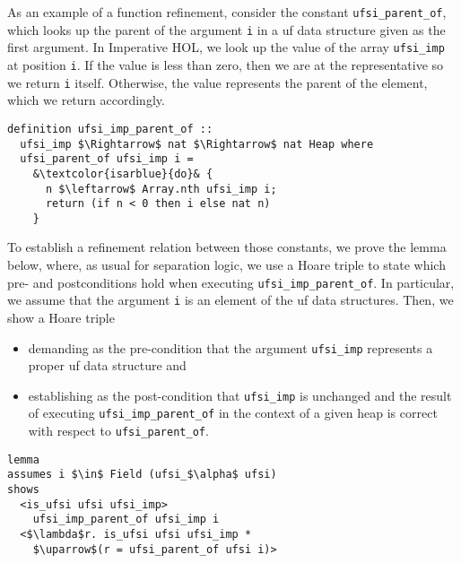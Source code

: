 \documentclass[
  sigplan,
  10pt,
  anonymous,
  review,
  ]{acmart}
\begin{document}
As an example of a function refinement, consider the constant \lstinline|ufsi_parent_of|, which looks up the parent of the argument \lstinline|i| in a \acrshort{uf} data structure given as the first argument.
In Imperative HOL, we look up the value of the array \lstinline|ufsi_imp| at position \lstinline|i|.
If the value is less than zero, then we are at the representative so we return \lstinline|i| itself.
Otherwise, the value represents the parent of the element, which we return accordingly.
\begin{lstlisting}
definition ufsi_imp_parent_of ::
  ufsi_imp $\Rightarrow$ nat $\Rightarrow$ nat Heap where
  ufsi_parent_of ufsi_imp i =
    &\textcolor{isarblue}{do}& {
      n $\leftarrow$ Array.nth ufsi_imp i;
      return (if n < 0 then i else nat n)
    }
\end{lstlisting}
To establish a refinement relation between those constants, we prove the lemma below, where, as usual for separation logic, we use a Hoare triple to state which pre- and postconditions hold when executing \lstinline|ufsi_imp_parent_of|.
In particular, we assume that the argument \lstinline|i| is an element of the \acrshort{uf} data structures.
Then, we show a Hoare triple
\begin{itemize}
  \item demanding as the pre-condition that the argument \lstinline|ufsi_imp| represents a proper \acrshort{uf} data structure and 
  \item establishing as the post-condition that \lstinline|ufsi_imp| is unchanged and the result of executing \lstinline|ufsi_imp_parent_of| in the context of a given heap is correct with respect to \lstinline|ufsi_parent_of|. 
\end{itemize}
\begin{lstlisting}
lemma
assumes i $\in$ Field (ufsi_$\alpha$ ufsi) 
shows 
  <is_ufsi ufsi ufsi_imp>
    ufsi_imp_parent_of ufsi_imp i
  <$\lambda$r. is_ufsi ufsi ufsi_imp *
    $\uparrow$(r = ufsi_parent_of ufsi i)>
\end{lstlisting}
\end{document}
